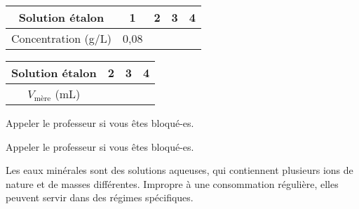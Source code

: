 \begin{center}
  \setlength{\extrarowheight}{4pt}
  \begin{tabular}{c | c | c | c | c}
    Solution étalon & \phantom{00}1\phantom{00} & \phantom{00}2\phantom{00}& \phantom{00}3\phantom{00} & \phantom{00}4\phantom{00} \\
    \hline
    Concentration (g/L) & 0,08 &  &  & 
  \end{tabular}
\end{center}


  
\begin{center}
  \setlength{\extrarowheight}{4pt}
  \begin{tabular}{c | c | c | c}
    Solution étalon & \phantom{00}2\phantom{00}& \phantom{00}3\phantom{00} & \phantom{00}4\phantom{00} \\
    \hline
    $V_\text{mère}$ (mL) &  &  &
  \end{tabular}
\end{center}

\appelProf Appeler le professeur si vous êtes bloqué-es.





\appelProf Appeler le professeur si vous êtes bloqué-es.




\newpage
\vspace*{-36pt}

\begin{encart}
  
  Les eaux minérales sont des solutions aqueuses, qui contiennent plusieurs ions de nature et de masses différentes.
  Impropre à une consommation régulière, elles peuvent servir dans des régimes spécifiques.
\end{encart}

